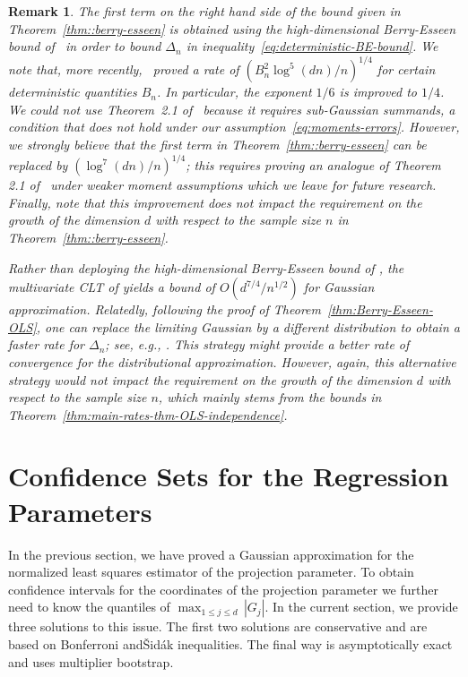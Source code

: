 \documentclass{article}
\newtheorem{remark}{Remark}
\begin{document}
 
 \begin{remark}
 The first term on the right hand side of the bound given in Theorem~\ref{thm::berry-esseen} is obtained using the high-dimensional Berry-Esseen bound of~\cite{koike2019notes} in order to bound $\Delta_n$ in inequality~\eqref{eq:deterministic-BE-bound}. 
 We note that, more recently,~\citet{chernozhukov2019improved} proved a rate of $(B_n^2\log^5(dn)/n)^{1/4}$ for certain deterministic quantities  $B_n$. 
 In particular, the exponent $1/6$ is improved to $1/4$. We could not use Theorem~2.1 of~\cite{chernozhukov2019improved} because it requires sub-Gaussian summands, a condition that does not hold under our assumption~\ref{eq:moments-errors}. However, we strongly believe that the first term in Theorem~\ref{thm::berry-esseen} can be replaced by $(\log^7(dn)/n)^{1/4}$; this requires proving an analogue of Theorem 2.1 of~\cite{chernozhukov2019improved} under weaker moment assumptions which we leave for future research. Finally, note that this improvement does not impact the requirement on the growth of the dimension $d$ with respect to the sample size $n$ in Theorem~\ref{thm::berry-esseen}.
 
 
 Rather than deploying the high-dimensional Berry-Esseen bound of \cite{koike2019notes}, the multivariate CLT of \cite{raivc2019multivariate} yields a bound of $O(d^{7/4}/n^{1/2})$ for Gaussian approximation. Relatedly, following the proof of Theorem~\ref{thm:Berry-Esseen-OLS}, one can replace the limiting Gaussian by a different distribution to obtain a faster rate for $\Delta_n$; see, e.g., \cite{zhilova2016non}. This strategy might provide a better rate of convergence for the distributional approximation. However, again, this alternative strategy would not impact the requirement on the growth of the dimension $d$ with respect to the sample size $n$, which mainly stems from the bounds in Theorem~\ref{thm:main-rates-thm-OLS-independence}.  
 \end{remark}
 
 
 \section{Confidence Sets for the Regression Parameters}\label{sec::confidence-sets-OLS}
 In the previous section, we have proved a Gaussian approximation for the normalized least squares estimator of the projection parameter. To obtain confidence intervals for the coordinates of the projection parameter we further need to know the quantiles of $\max_{1\le j\le d}\,|G_j|$. In the current section, we provide three solutions to this issue. The first two solutions are conservative and are based on Bonferroni and{\v{S}}id{\'a}k inequalities. The final way is asymptotically exact and uses multiplier bootstrap.  
\end{document}
